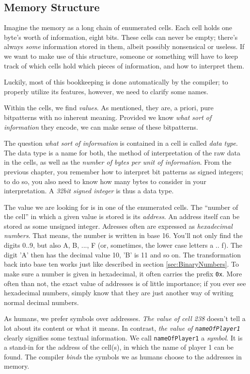 \subsection{Memory Structure}
Imagine the memory as a long chain of enumerated cells. Each cell holds one byte's worth of information, \ie eight bits. These cells can never be empty; there's always \emph{some} information stored in them, albeit possibly nonsensical or useless. If we want to make use of this structure, someone or something will have to keep track of which cells hold which pieces of information, and how to interpret them.

Luckily, most of this bookkeeping is done automatically by the compiler; to properly utilize its features, however, we need to clarify some names.

Within the cells, we find \emph{values}. As mentioned, they are, a priori, pure bitpatterns with no inherent meaning. Provided we know \emph{what sort of information} they encode, we can make sense of these bitpatterns.

The question \emph{what sort of information} is contained in a cell is called \emph{data type}. The data type is a name for both, the method of interpretation of the raw data in the cells, as well as the \emph{number of bytes per unit of information}. From the previous chapter, you remember how to interpret bit patterns as signed integers; to do so, you also need to know how many bytes to consider in your interpretation. A \emph{32bit signed integer} is thus a data type.

The value we are looking for is in one of the enumerated cells. The \enquote{number of the cell} in which a given value is stored is its \emph{address}. An address itself can be stored as some unsigned integer. Adresses often are expressed as \emph{hexadecimal numbers}. That means, the number is written in base 16. You'll not only find the digits 0..9, but also A, B, ..., F (or, sometimes, the lower case letters a .. f). The digit 'A' then has the decimal value 10, 'B' is 11 and so on. The transformation back into base ten works just like described in section \ref{sec:BinaryNumbers}. To make sure a number is given in hexadecimal, it often carries the prefix \texttt{0x}. More often than not, the exact value of addresses is of little importance; if you ever see hexadecimal numbers, simply know that they are just another way of writing normal decimal numbers.

As humans, we prefer symbols over addresses. \emph{The value of cell 238} doesn't tell a lot about its content or what it means. In contrast, \emph{the value of \texttt{nameOfPlayer1}} clearly signifies some textual information. We call \texttt{nameOfPlayer1} a \emph{symbol}. It is a stand-in for the address of the cell(s), in which the name of player 1 can be found. The compiler \emph{binds} the symbols we as humans choose to the addresses in memory.


